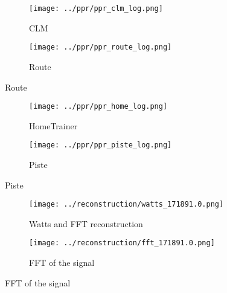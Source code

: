 \documentclass{beamer}
\begin{document}

\begin{frame}
    \begin{figure}
        \centering
        \begin{subfigure}{0.7\textwidth}
            \centering
            \texttt{[image: ../ppr/ppr\_clm\_log.png]}
            \caption{CLM}
        \end{subfigure}
        \begin{subfigure}{0.7\textwidth}
            \centering
            \texttt{[image: ../ppr/ppr\_route\_log.png]}
            \caption{Route}
        \end{subfigure}
    \end{figure}
\end{frame}

\begin{frame}

    \begin{figure}
        \centering
        \begin{subfigure}{0.7\textwidth}
            \centering
            \texttt{[image: ../ppr/ppr\_home\_log.png]}
            \caption{HomeTrainer}
        \end{subfigure}

        \begin{subfigure}{0.7\textwidth}
            \centering
            \texttt{[image: ../ppr/ppr\_piste\_log.png]}
            \caption{Piste}
        \end{subfigure}

    \end{figure}
\end{frame}


\begin{frame}
    
    \begin{figure}
        
        \begin{subfigure}{0.7\textwidth}
            \centering
            \texttt{[image: ../reconstruction/watts\_171891.0.png]}
            \caption{Watts and FFT reconstruction
            }
        \end{subfigure}
        \begin{subfigure}{0.7\textwidth}
            \centering
            \texttt{[image: ../reconstruction/fft\_171891.0.png]}
            \caption{FFT of the signal}
        \end{subfigure}

    \end{figure}


\end{frame}
\end{document}
